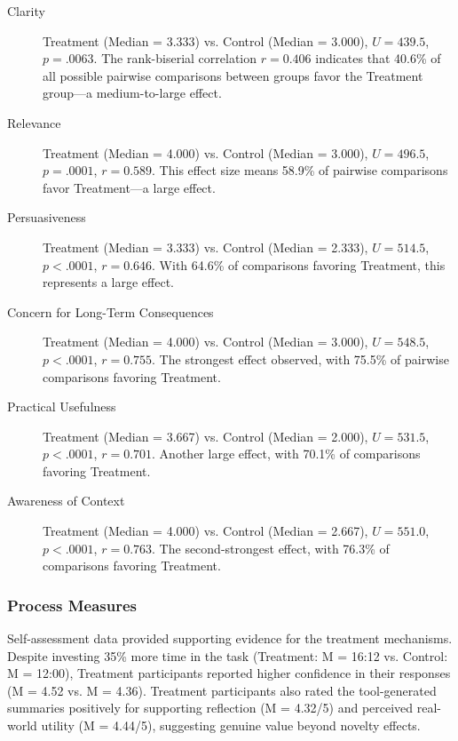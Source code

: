 \begin{description}
  \item [Clarity] Treatment (Median = 3.333) vs. Control (Median = 3.000), $U = 439.5$, $p = .0063$. The rank-biserial correlation $r = 0.406$ indicates that 40.6\% of all possible pairwise comparisons between groups favor the Treatment group—a medium-to-large effect.

  \item [Relevance] Treatment (Median = 4.000) vs. Control (Median = 3.000), $U = 496.5$, $p = .0001$, $r = 0.589$. This effect size means 58.9\% of pairwise comparisons favor Treatment—a large effect.

  \item [Persuasiveness] Treatment (Median = 3.333) vs. Control (Median = 2.333), $U = 514.5$, $p < .0001$, $r = 0.646$. With 64.6\% of comparisons favoring Treatment, this represents a large effect.

  \item [Concern for Long-Term Consequences] Treatment (Median = 4.000) vs. Control (Median = 3.000), $U = 548.5$, $p < .0001$, $r = 0.755$. The strongest effect observed, with 75.5\% of pairwise comparisons favoring Treatment.

  \item [Practical Usefulness] Treatment (Median = 3.667) vs. Control (Median = 2.000), $U = 531.5$, $p < .0001$, $r = 0.701$. Another large effect, with 70.1\% of comparisons favoring Treatment.

  \item [Awareness of Context] Treatment (Median = 4.000) vs. Control (Median = 2.667), $U = 551.0$, $p < .0001$, $r = 0.763$. The second-strongest effect, with 76.3\% of comparisons favoring Treatment.
\end{description}

\subsubsection*{Process Measures}

Self-assessment data provided supporting evidence for the treatment mechanisms. Despite investing 35\% more time in the task (Treatment: M = 16:12 vs. Control: M = 12:00), Treatment participants reported higher confidence in their responses (M = 4.52 vs. M = 4.36). Treatment participants also rated the tool-generated summaries positively for supporting reflection (M = 4.32/5) and perceived real-world utility (M = 4.44/5), suggesting genuine value beyond novelty effects.

